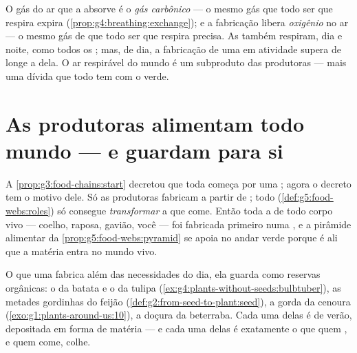 \begin{remark}\label{rem:g6:plants-are-producers:gas}
O gás do ar que a  absorve é o \emph{gás carbônico} --- o mesmo
gás que todo ser que respira expira
(\cref{prop:g4:breathing:exchange}); e a fabricação libera
\emph{oxigênio} no ar --- o mesmo gás de que todo ser que respira
precisa. As  também respiram, dia e noite, como todos os ; mas, de dia, a fabricação de uma  em atividade supera de
longe a  dela. O ar respirável do mundo é um subproduto das
produtoras --- mais uma dívida que todo  tem com o verde.
\end{remark}

\section{As produtoras alimentam todo mundo --- e guardam para si}

\begin{proposition}\label{prop:g6:plants-are-producers:firstlink}
A \cref{prop:g3:food-chains:start} decretou que toda 
começa por uma ; agora o decreto tem o motivo dele. Só as
produtoras fabricam  a partir de ;
todo  (\cref{def:g5:food-webs:roles}) só consegue
\emph{transformar} a  que come. Então toda a  de todo corpo vivo --- coelho, raposa, gavião, você --- foi
fabricada primeiro numa , e a pirâmide alimentar da
\cref{prop:g5:food-webs:pyramid} se apoia no andar verde porque é ali
que a matéria entra no mundo vivo.
\end{proposition}
\admitted

\begin{example}\label{ex:g6:plants-are-producers:pantry}
O que uma  fabrica além das necessidades do dia, ela guarda como
reservas orgânicas: o  da batata e o  da tulipa
(\cref{ex:g4:plants-without-seeds:bulbtuber}), as metades gordinhas do
feijão (\cref{def:g2:from-seed-to-plant:seed}), a  gorda da
cenoura (\cref{exo:g1:plants-around-us:10}), a doçura da beterraba.
Cada uma delas é  de verão, depositada em forma de matéria --- e
cada uma delas é exatamente o que quem , e quem come, colhe.
\end{example}

